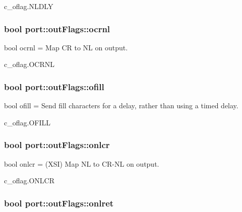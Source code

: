 c\+\_\+oflag.\+N\+L\+D\+LY
\subsubsection[{\texorpdfstring{ocrnl}{ocrnl}}]{\setlength{\rightskip}{0pt plus 5cm}bool port\+::out\+Flags\+::ocrnl}\hypertarget{classport_1_1outFlags_a70a63948b2b1f2d1a33c14861938105d}{}\label{classport_1_1outFlags_a70a63948b2b1f2d1a33c14861938105d}


bool ocrnl = Map CR to NL on output. 

c\+\_\+oflag.\+O\+C\+R\+NL
\subsubsection[{\texorpdfstring{ofill}{ofill}}]{\setlength{\rightskip}{0pt plus 5cm}bool port\+::out\+Flags\+::ofill}\hypertarget{classport_1_1outFlags_af0ae89ef0e6a68c95cf3bcabc84019f5}{}\label{classport_1_1outFlags_af0ae89ef0e6a68c95cf3bcabc84019f5}


bool ofill = Send fill characters for a delay, rather than using a timed delay. 

c\+\_\+oflag.\+O\+F\+I\+LL
\subsubsection[{\texorpdfstring{onlcr}{onlcr}}]{\setlength{\rightskip}{0pt plus 5cm}bool port\+::out\+Flags\+::onlcr}\hypertarget{classport_1_1outFlags_a57f996933d316ad79637030e2cb06898}{}\label{classport_1_1outFlags_a57f996933d316ad79637030e2cb06898}


bool onlcr = (X\+SI) Map NL to C\+R-\/\+NL on output. 

c\+\_\+oflag.\+O\+N\+L\+CR
\subsubsection[{\texorpdfstring{onlret}{onlret}}]{\setlength{\rightskip}{0pt plus 5cm}bool port\+::out\+Flags\+::onlret}\hypertarget{classport_1_1outFlags_a0aa44f8e847dc5d6392973e255946079}{}\label{classport_1_1outFlags_a0aa44f8e847dc5d6392973e255946079}


